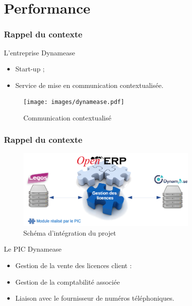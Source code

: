 \section{Performance}
\author{Kévin Moreau}


\begin{frame}
	\frametitle{Rappel du contexte}

	\begin{block}{L'entreprise Dynamease}
	 \begin{itemize}
      \item Start-up ;
	  \item Service de mise en communication contextualisée.
	 \end{itemize}
	\end{block}

    \begin{center}
	  \begin{figure}
        \texttt{[image: images/dynamease.pdf]}
	   \caption{Communication contextualisé}
	  \end{figure}
	\end{center}
\end{frame}

\begin{frame}
	\frametitle{Rappel du contexte}
	
	\begin{center}
	  \begin{figure}
	   \includegraphics[width=0.80\textwidth]{images/schemaGlobal.png}
	   \caption{Schéma d'intégration du projet}
	  \end{figure}
	\end{center}

    \begin{block}{Le PIC Dynamease}
	 \begin{itemize}
	  \item Gestion de la vente des licences client :
      \item Gestion de la comptabilité associée
	  \item Liaison avec le fournisseur de numéros téléphoniques.
	 \end{itemize}
	\end{block}

\end{frame}


